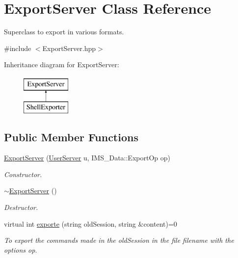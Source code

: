 \hypertarget{classExportServer}{
\section{ExportServer Class Reference}
\label{classExportServer}
}


Superclass to export in various formats.  




{\ttfamily \#include $<$ExportServer.hpp$>$}

Inheritance diagram for ExportServer:\begin{figure}[H]
\begin{center}
\leavevmode
\includegraphics[height=2.000000cm]{classExportServer}
\end{center}
\end{figure}
\subsection*{Public Member Functions}
\begin{DoxyCompactItemize}
\item 
\hyperlink{classExportServer_ac42e32c2e2b06e6d5f2cf3a56c9161e4}{ExportServer} (\hyperlink{classUserServer}{UserServer} u, IMS\_\-Data::ExportOp op)
\begin{DoxyCompactList}\small\item\em Constructor. \item\end{DoxyCompactList}\item 
\hypertarget{classExportServer_a99b953bd9791e9671224a4cb93fc2afa}{
\hyperlink{classExportServer_a99b953bd9791e9671224a4cb93fc2afa}{$\sim$ExportServer} ()}
\label{classExportServer_a99b953bd9791e9671224a4cb93fc2afa}

\begin{DoxyCompactList}\small\item\em Destructor. \item\end{DoxyCompactList}\item 
virtual int \hyperlink{classExportServer_acb16e159a3c1b7113b97699ce522d350}{exporte} (string oldSession, string \&content)=0
\begin{DoxyCompactList}\small\item\em To export the commands made in the oldSession in the file filename with the options op. \item\end{DoxyCompactList}\end{DoxyCompactItemize}
